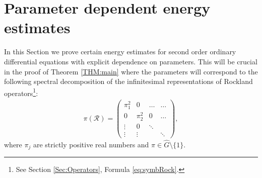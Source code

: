 \documentclass[12pt,oneside,a4paper]{book}
\numberwithin{equation}{section}     %
\theoremstyle{plain}
\theoremstyle{definition}
\begin{document}
\section{Parameter dependent energy estimates}
\label{SEC:ODE}

In this Section we prove certain energy estimates for second order ordinary differential equations with explicit dependence on parameters. This will be crucial in the proof of Theorem \ref{THM:main} where the parameters will correspond to the following spectral decomposition of the infinitesimal representations of Rockland operators\footnote{See Section \ref{Sec:Operators}, Formula \eqref{eq:symbRock}.}:
\begin{align}\label{EQ:R-spec}
\pi(\mathcal R)=\begin{pmatrix}
\pi^2_1 & 0      & \dots    & \dots \\
0      & \pi^2_2 & 0    & \dots \\
\vdots&   0       & \ddots  &          \\
\vdots& \vdots  &             & \ddots
\end{pmatrix},
\end{align}
where $\pi_j$ are strictly positive real numbers and $\pi\in\widehat G\setminus\{1\}$.\
\end{document}
